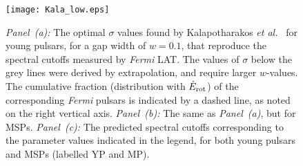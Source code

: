 \documentclass{PoS}
\begin{document}
\begin{figure}[t]
  \begin{center}
  \texttt{[image: Kala\_low.eps]}
  \caption{\textit{Panel~(a):} The optimal $\sigma$ values found by Kalapotharakos \textit{et al.}~\cite{Kalapotharakos17a} for young pulsars, for a gap width of $w=0.1$, that reproduce the spectral cutoffs measured by \textit{Fermi} LAT. The values of $\sigma$ below the grey lines were derived by extrapolation, and require larger $w$-values. The cumulative fraction (distribution with $\dot{E}_{\rm rot}$) of the corresponding \textit{Fermi} pulsars is indicated by a dashed line, as noted on the right vertical axis. \textit{Panel~(b):} The same as \textit{Panel~(a)}, but for MSPs. \textit{Panel~(c):} The predicted spectral cutoffs corresponding to the parameter values indicated in the legend, for both young pulsars and MSPs (labelled YP and MP).}
  \label{fig:Kala}
  \end{center}
\end{figure}
\end{document}
